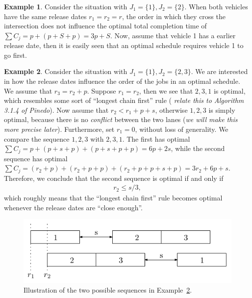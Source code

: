 \documentclass{article}
\theoremstyle{definition}
\newtheorem{eg}{Example}[section]
\theoremstyle{plain}
\begin{document}
\begin{eg}
  Consider the situation with $J_{1} = \{ 1 \}, J_{2} = \{ 2 \}$. When both
  vehicles have the same release dates $r_{1} = r_{2} = r$, the order in which
  they cross the intersection does not influence the optimal total completion
  time of $\sum C_{j} = p + (p + S + p) = 3p + S$. Now, assume that vehicle 1
  has a earlier release date, then it is easily seen that an optimal schedule
  requires vehicle 1 to go first.
\end{eg}
%
\begin{eg}
  \label{example2}
  Consider the situation with $J_{1} = \{ 1 \}, J_{2} = \{ 2, 3 \}$. We are
  interested in how the release dates influence the order of the jobs in an
  optimal schedule. We assume that $r_{3} = r_{2} + p$. Suppose $r_{1} = r_{2}$,
  then we see that $2, 3, 1$ is optimal, which resembles some sort of ``longest
  chain first'' rule (\textit{\color{blue} relate this to Algorithm 3.1.4 of
    Pinedo}). Now assume that $r_{2} < r_{1} + p + s$, otherwise $1, 2, 3$ is
  simply optimal, because there is no \textit{conflict} between the two lanes
  (\textit{\color{blue}we will make this more precise later}). Furthermore, set
  $r_{1} = 0$, without loss of generality. We compare the sequence $1, 2, 3$
  with $2, 3, 1$. The first has optimal
  $\sum C_{j} = p + (p+s+p) + (p+s+p+p) = 6p + 2s$, while the second sequence
  has optimal
  $\sum C_{j} = (r_{2} + p) + (r_{2} + p + p) + (r_{2} + p + p + s + p) = 3 r_{2} + 6p + s$.
  Therefore, we conclude that the second sequence is optimal if and only if
  \begin{align*}
    r_{2} \leq s/3 ,
  \end{align*}
  which roughly means that the ``longest chain first'' rule becomes optimal
  whenever the release dates are ``close enough''.
\end{eg}
%
\begin{figure}
  \centering
  \includegraphics{figures/123.pdf}
  \caption{Illustration of the two possible sequences in Example~\ref{example2}.}
  \label{fig:example2}
\end{figure}
\end{document}
